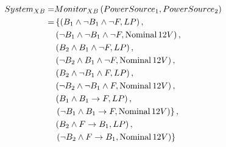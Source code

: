 \documentclass[12pt,openright,twoside,a4paper,oldfontcommands,english,brazil,final]{abntex2}
\theoremstyle{theo}
\def\xbeforeop{\ensuremath\rightarrow}
\newcommand{\xbefore}[2]{\ensuremath #1 \xbeforeop #2 }
\newcommand{\Nominal}[1]{\ensuremath\mathop{\mathrm{Nominal}} #1}
\newcommand{\modes}[2]{\ensuremath\mathrm{modes}\left(#1,#2\right)}
\begin{document}
\begin{align*}
System_{XB} = & Monitor_{XB} \left(PowerSource_1, PowerSource_2\right) \\
  = & \left\{ 
      \left(B_1 \land \lnot B_1 \land \lnot F, LP\right), \right.\\
  &   \left(\lnot B_1 \land \lnot B_1 \land \lnot F, \Nominal{12V}\right), \\
  &   \left(B_2 \land B_1 \land \lnot F, LP\right),\\
  &   \left(\lnot B_2 \land B_1 \land \lnot F, \Nominal{12V}\right), \\
  &   \left(B_2 \land \lnot B_1 \land F, LP\right), \\
  &   \left(\lnot B_2 \land \lnot B_1 \land F, \Nominal{12V}\right),\\
  &   \left(B_1 \land \xbefore{B_1}{F}, LP\right), \\
  &   \left.\left(\lnot B_1 \land \xbefore{B_1}{F}, \Nominal{12V}\right)\right\}, \\
  &   \left(B_2 \land \xbefore{F}{B_1}, LP\right), \\
  &   \left.\left(\lnot B_2 \land \xbefore{F}{B_1}, \Nominal{12V}\right)\right\}
    \\
\end{align*}
\end{document}
